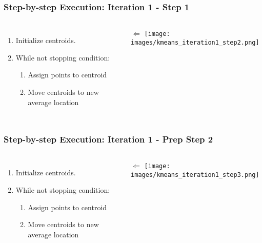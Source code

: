 \documentclass{beamer}
\begin{document}
\begin{frame}
  \frametitle{Step-by-step Execution: Iteration 1 - Step 1}
  \begin{columns}
      \begin{enumerate}
        \item Initialize centroids. \vspace{2mm}
        \item While not stopping condition: \vspace{2mm}
        \begin{enumerate}
          \item Assign points to centroid \vspace{2mm}
          \item Move centroids to new average location
        \end{enumerate}
      \end{enumerate}
      \vspace{11mm} $\Longleftarrow$
      \texttt{[image: images/kmeans\_iteration1\_step2.png]}
  \end{columns}
\end{frame}

\begin{frame}
  \frametitle{Step-by-step Execution: Iteration 1 - Prep Step 2 }
  \begin{columns}
      \begin{enumerate}
        \item Initialize centroids. \vspace{2mm}
        \item While not stopping condition: \vspace{2mm}
        \begin{enumerate}
          \item Assign points to centroid \vspace{2mm}
          \item Move centroids to new average location
        \end{enumerate}
      \end{enumerate}
      \vspace{22mm} $\Longleftarrow$
      \texttt{[image: images/kmeans\_iteration1\_step3.png]}
  \end{columns}
\end{frame}
\end{document}
